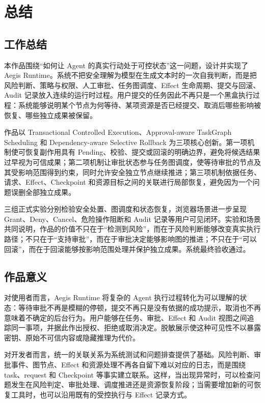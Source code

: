 \chapter{总结}

\section{工作总结}

本作品围绕“如何让 Agent 的真实行动处于可控状态”这一问题，设计并实现了 Aegis Runtime。系统不把安全理解为模型在生成文本时的一次自我判断，而是把风险判断、策略与权限、人工审批、任务图调度、Effect 生命周期、提交与回滚、Audit 记录放入连续的运行时过程。用户提交的任务因此不再只是一个黑盒执行过程：系统能够说明某个节点为何等待、某项资源是否已经提交、取消后哪些影响被恢复、哪些独立成果被保留。

作品以 Transactional Controlled Execution、Approval-aware TaskGraph Scheduling 和 Dependency-aware Selective Rollback 为三项核心创新。第一项机制使可恢复副作用具有 Pending、校验、提交或回滚的明确边界，避免将候选结果过早视为可信成果；第二项机制让审批状态参与任务图调度，使等待审批的节点及其受影响范围得到约束，同时允许安全独立节点继续推进；第三项机制依据任务、请求、Effect、Checkpoint 和资源目标之间的关联进行局部恢复，避免因为一个问题误删全部独立成果。

三组正式实验分别检验安全处置、图调度和状态恢复，浏览器场景进一步呈现 Grant、Deny、Cancel、危险操作阻断和 Audit 记录等用户可见闭环。实验和场景共同说明，作品的价值不只在于“检测到风险”，而在于风险判断能够改变真实执行路径；不只在于“支持审批”，而在于审批决定能够影响图的推进；不只在于“可以回滚”，而在于回滚能够按影响范围处理并保护独立成果。系统最终验收通过。

\section{作品意义}

对使用者而言，Aegis Runtime 将复杂的 Agent 执行过程转化为可以理解的状态：等待审批不再是模糊的停顿，提交不再只是没有依据的成功提示，取消也不再意味着不确定的后台行为。用户能够在任务、审批、Effect 和 Audit 视图之间追踪同一事项，并据此作出授权、拒绝或取消决定。脱敏展示使这种可见性不以暴露密钥、原始不可信内容或隐藏推理为代价。

对开发者而言，统一的关联关系为系统测试和问题排查提供了基础。风险判断、审批事件、图节点、Effect 和资源处理不再各自留下难以对应的日志，而是围绕 task、request 和 Checkpoint 等事实建立联系。这样，当出现异常时，可以检查问题发生在风险判定、审批处理、调度推进还是资源恢复阶段；当需要增加新的可恢复工具时，也可以沿用既有的受控执行与 Effect 记录方式。

